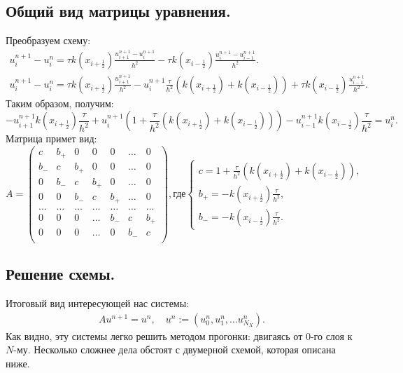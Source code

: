 \documentclass[14pt,a4paper]{extarticle}
\newcommand{\1}{\mathbbm{1}}
\begin{document}
\subsection{Общий вид матрицы уравнения.}
Преобразуем схему:
\begin{align*}
    u^{n+1}_i - u^n_i = \tau k(x_{i + \frac{1}{2}}) \frac{u^{n+1}_{i+1} - u^{n+1}_{i}}{h^2} - \tau k(x_{i- \frac{1}{2}}) \frac{u^{n+1}_{i} - u^{n+1}_{i-1}}{h^2}.\\
    u^{n+1}_i - u^n_i = 
    \tau k(x_{i + \frac{1}{2}}) \frac{u^{n+1}_{i+1} }{h^2} 
    - u^{n+1}_i \frac{\tau}{h^2} (k(x_{i + \frac{1}{2}}) + k(x_{i - \frac{1}{2}})) 
    + \tau k(x_{i- \frac{1}{2}}) \frac{u^{n+1}_{i-1}}{h^2}. 
\end{align*}
Таким образом, получим:
\begin{equation}
    - u^{n+1}_{i+1} k(x_{i + \frac{1}{2}}) \frac{\tau}{h^2} +
    u^{n+1}_i\left(1 + \frac{\tau}{h^2} (k(x_{i + \frac{1}{2}}) + k(x_{i - \frac{1}{2}}))\right) - u^{n+1}_{i-1} k(x_{i- \frac{1}{2}}) \frac{ \tau}{h^2} = u^n_i.
\end{equation}
Матрица примет вид: \\
$$A = \begin{pmatrix}
    c   & b_+ & 0     & 0   & 0   & \ldots & 0 \\
    b_- & c   & b_+   & 0   & 0   & \ldots & 0 \\
    0   & b_- & c     & b_+ & 0   & \ldots & 0 \\
    0   & 0   & b_-   & c   & b_+ & \ldots & 0 \\
    \ldots & \ldots & \ldots & \ldots & \ldots & \ldots & \ldots \\
    0   & 0   & 0    & \ldots & b_- & c & b_+ \\
    0   & 0   & 0     & \ldots & 0 & b_- & c \\
\end{pmatrix}, \text{где}
\left\{\begin{array}{l}
 c = 1 + \frac{\tau}{h^2} (k(x_{i + \frac{1}{2}}) + k(x_{i - \frac{1}{2}})), \\
 b_+ = -k(x_{i + \frac{1}{2}}) \frac{\tau}{h^2}, \\
 b_- = -k(x_{i - \frac{1}{2}}) \frac{\tau}{h^2}.
\end{array}\right. 
$$
\subsection{Решение схемы.}
Итоговый вид интересующей нас системы:
\begin{align*}
    A u^{n+1} = u^n, \quad u^n := (u^n_0, u^n_1, \ldots u^n_{N_X}).
\end{align*}
Как видно, эту системы легко решить методом прогонки: двигаясь от 0-го слоя к $N$-му. Несколько сложнее дела обстоят с двумерной схемой, которая описана ниже.
\end{document}
